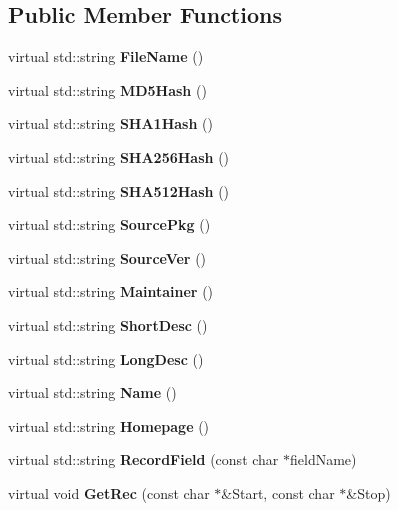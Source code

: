 \subsection*{\-Public \-Member \-Functions}
\begin{DoxyCompactItemize}
\item 
virtual std\-::string {\bfseries \-File\-Name} ()\label{classpkgRecords_1_1Parser_a81f7d0fa85f2935e81e0fc0e17535afd}

\item 
virtual std\-::string {\bfseries \-M\-D5\-Hash} ()\label{classpkgRecords_1_1Parser_a7ee670bfe6935b52e7e2e1abf4597433}

\item 
virtual std\-::string {\bfseries \-S\-H\-A1\-Hash} ()\label{classpkgRecords_1_1Parser_a376cd93c062231a89f1d5db5e61f92ba}

\item 
virtual std\-::string {\bfseries \-S\-H\-A256\-Hash} ()\label{classpkgRecords_1_1Parser_af3cfd071aea4100fd3b9e6dddc8928ce}

\item 
virtual std\-::string {\bfseries \-S\-H\-A512\-Hash} ()\label{classpkgRecords_1_1Parser_ac6613a252c8f6db0cbc209d8597eb33a}

\item 
virtual std\-::string {\bfseries \-Source\-Pkg} ()\label{classpkgRecords_1_1Parser_a0fcb7c02f2c131dd913fce2abe6a15fe}

\item 
virtual std\-::string {\bfseries \-Source\-Ver} ()\label{classpkgRecords_1_1Parser_af13bc121c26d20adc313a72da7484ddb}

\item 
virtual std\-::string {\bfseries \-Maintainer} ()\label{classpkgRecords_1_1Parser_a7ad2e875d784eb6ba80b51d4d5ab3eb0}

\item 
virtual std\-::string {\bfseries \-Short\-Desc} ()\label{classpkgRecords_1_1Parser_a0fc996230e235126c070608a0e170fe5}

\item 
virtual std\-::string {\bfseries \-Long\-Desc} ()\label{classpkgRecords_1_1Parser_a889a7633e501810038e230fe5f6ad1db}

\item 
virtual std\-::string {\bfseries \-Name} ()\label{classpkgRecords_1_1Parser_a4be3a99c946b4d93d005c3a34129d48d}

\item 
virtual std\-::string {\bfseries \-Homepage} ()\label{classpkgRecords_1_1Parser_af8a5e2bc3e5bb9d13e7ce9feb23bf8b3}

\item 
virtual std\-::string {\bfseries \-Record\-Field} (const char $\ast$field\-Name)\label{classpkgRecords_1_1Parser_a06a6729f96f86040909b7b1009e336e3}

\item 
virtual void {\bfseries \-Get\-Rec} (const char $\ast$\&\-Start, const char $\ast$\&\-Stop)\label{classpkgRecords_1_1Parser_a9a909af057784ae80d1dccbea2cb15b1}

\end{DoxyCompactItemize}
